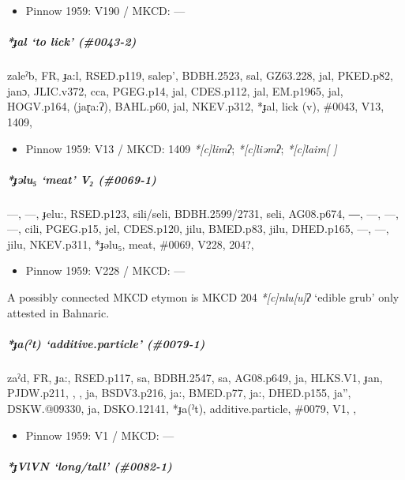 \documentclass[a4paper,]{article}
\providecommand{\tightlist}{%
  \setlength{\itemsep}{0pt}\setlength{\parskip}{0pt}}
\let\oldsubparagraph\subparagraph
\renewcommand{\subparagraph}[1]{\oldsubparagraph{#1}\mbox{}}
\begin{document}
\begin{itemize}
\tightlist
\item
  Pinnow 1959: V190 / MKCD: ---
\end{itemize}

\subparagraph{\texorpdfstring{\emph{*ɟal} `to lick'
(\#0043-2)}{*ɟal to lick (\#0043-2)}}\label{ux25fal-to-lick-0043-2-1}

zaleˀb, FR, ɟa:l, RSED.p119, salep', BDBH.2523, sal, GZ63.228, jal,
PKED.p82, janɔ, JLIC.v372, cca, PGEG.p14, jal, CDES.p112, jal, EM.p1965,
jal, HOGV.p164, (jaɽa:ʔ), BAHL.p60, jal, NKEV.p312, *ɟal, lick (v),
\#0043, V13, 1409,

\begin{itemize}
\tightlist
\item
  Pinnow 1959: V13 / MKCD: 1409 \emph{*{[}c{]}limʔ};
  \emph{*{[}c{]}liəmʔ}; \emph{*{[}c{]}laim{[} {]}}
\end{itemize}

\subparagraph{\texorpdfstring{\emph{*ɟəlu₅} `meat' V₂
(\#0069-1)}{*ɟəlu₅ meat V₂ (\#0069-1)}}\label{ux25fux259lu-meat-v-0069-1}

---, ---, ɟelu:, RSED.p123, sili/seli, BDBH.2599/2731, seli, AG08.p674,
―, ---, ---, ---, cili, PGEG.p15, jel, CDES.p120, jilu, BMED.p83, jilu,
DHED.p165, ---, ---, jilu, NKEV.p311, *ɟəlu₅, meat, \#0069, V228, 204?,

\begin{itemize}
\tightlist
\item
  Pinnow 1959: V228 / MKCD: ---
\end{itemize}

A possibly connected MKCD etymon is MKCD 204 \emph{*{[}c{]}nlu{[}u{]}ʔ}
`edible grub' only attested in Bahnaric.

\subparagraph{\texorpdfstring{\emph{*ɟa(ˀt)} `additive.particle'
(\#0079-1)}{*ɟa(ˀt) additive.particle (\#0079-1)}}\label{ux25faux2c0t-additive.particle-0079-1}

zaˀd, FR, ɟa:, RSED.p117, sa, BDBH.2547, sa, AG08.p649, ja, HLKS.V1,
ɟan, PJDW.p211, , , ja, BSDV3.p216, ja:, BMED.p77, ja:, DHED.p155, ja'',
DSKW.@09330, ja, DSKO.12141, *ɟa(ˀt), additive.particle, \#0079, V1, ,

\begin{itemize}
\tightlist
\item
  Pinnow 1959: V1 / MKCD: ---
\end{itemize}

\subparagraph{\texorpdfstring{\emph{*ɟVlVN} `long/tall'
(\#0082-1)}{*ɟVlVN long/tall (\#0082-1)}}\label{ux25fvlvn-longtall-0082-1}
\end{document}
